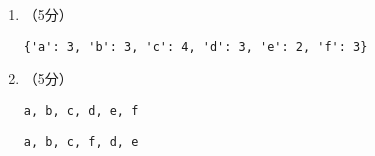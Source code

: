 \documentclass[8pt]{article}
\begin{document}
\begin{CJK}{UTF8}{gkai}
\begin{enumerate}
\begin{enumerate}
\begin{figure}[htbp]
    \end{figure}
  \item （5分）
    \begin{lstlisting}
{'a': 3, 'b': 3, 'c': 4, 'd': 3, 'e': 2, 'f': 3}     
    \end{lstlisting}
  \item （5分）~
    \begin{lstlisting}[title=深度优先]
a, b, c, d, e, f          
    \end{lstlisting}
    \begin{lstlisting}[title=广度优先]
a, b, c, f, d, e
    \end{lstlisting}

\end{enumerate}
\end{enumerate}



\end{CJK}
\end{document}
